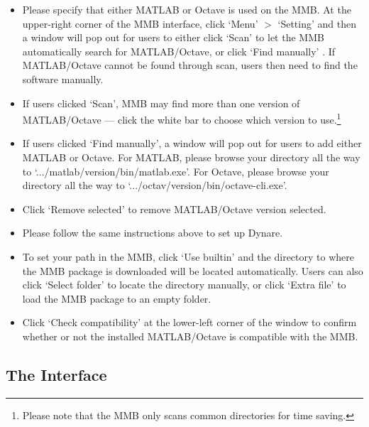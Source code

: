 \documentclass[10pt,a4paper]{article}
\begin{document}
\begin{itemize}
\item Please specify that either MATLAB or Octave is used on the MMB. At the upper-right corner of the MMB interface, click ‘Menu’ $>$ ‘Setting’ and then a window will pop out for users to either click ‘Scan’ to let the MMB automatically search for MATLAB/Octave, or click ‘Find manually’ . If MATLAB/Octave cannot be found through scan, users then need to find the software manually.

\item If users clicked ‘Scan’, MMB may find more than one version of MATLAB/Octave — click the white bar to choose which version to use.\footnote{Please note that the MMB only scans common directories for time saving.}

\item If users clicked ‘Find manually’, a window will pop out for users to add either MATLAB or Octave. For MATLAB, please browse your directory all the way to ‘.../matlab/version/bin/matlab.exe’. For Octave, please browse your directory all the way to ‘.../octav/version/bin/octave-cli.exe’.

\item Click ‘Remove selected’ to remove MATLAB/Octave version selected.

\item Please follow the same instructions above to set up Dynare.

\item To set your path in the MMB, click ‘Use builtin’ and the directory to where the MMB package is downloaded will be located automatically. Users can also click ‘Select folder’ to locate the directory manually, or click ‘Extra file’ to load the MMB package to an empty folder.

\item Click ‘Check compatibility’ at the lower-left corner of the window to confirm whether or not the installed MATLAB/Octave is compatible with the MMB.
\end{itemize}
\pagebreak








\begin{flushleft}
\section{The Interface}
\end{flushleft}
\medskip
\end{document}
